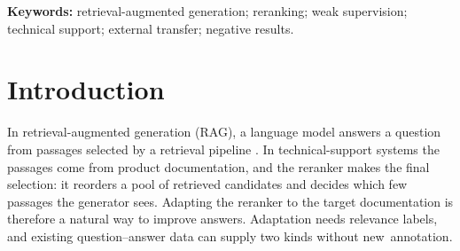\begin{abstract}
Rerankers decide which passages a retrieval-augmented generation (RAG) system shows to its generator, and adapting them requires relevance labels. Document-level labels come free with question--answer data but are coarse: they mark every passage of the correct document as relevant, even when it lacks the answer. Labels that instead reward passages containing the reference answer verbatim look more precise. We put this literal-match supervision to a controlled test, with a fixed generator and a success criterion set in advance: a statistically significant gain of at least one point in answer F1 (word overlap with the reference answer). In neither study does it deliver that gain. On 208 held-out TechQA technical-support questions, it improves passage ranking over hybrid retrieval, but the answer gain is not significant ($\SoneDelta$ points). Under transfer to support dialogues (Doc2Dial), it ranks evidence worse than document-level labels and gives slightly lower answer F1 ($\StwoDelta$ points); for the trained adapters, the targeted gain is ruled out. A second finding holds across both studies: clear differences in retrieval quality barely move answer F1, which also tracks response length. Retrieval metrics are therefore an unreliable guide here, and reranker supervision should be judged by the answers it produces, using an answer metric shown to detect retrieval changes.
\end{abstract}
\noindent\textbf{Keywords:} retrieval-augmented generation; reranking; weak supervision; technical support; external transfer; negative results.

\section{Introduction}
In retrieval-augmented generation (RAG), a language model answers a question from passages selected by a retrieval pipeline \citep{lewis2020}. In technical-support systems the passages come from product documentation, and the reranker makes the final selection: it reorders a pool of retrieved candidates and decides which few passages the generator sees. Adapting the reranker to the target documentation is therefore a natural way to improve answers. Adaptation needs relevance labels, and existing question--answer data can supply two kinds without new~annotation.

